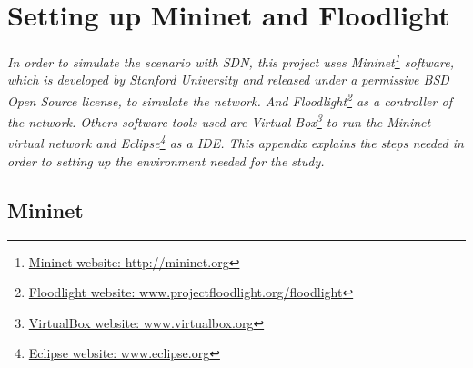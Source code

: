 

\chapter{Setting up Mininet and Floodlight}

\textit{In order to simulate the scenario with SDN, this project uses Mininet\footnote{\href{http://mininet.org/}{Mininet website: http://mininet.org}} software, which is developed by Stanford University and released under a permissive BSD Open Source license, to simulate the network. And Floodlight\footnote{\href{http://www.projectfloodlight.org/floodlight/}{Floodlight website: www.projectfloodlight.org/floodlight}} as a controller of the network. Others software tools used are Virtual Box\footnote{\href{https://www.virtualbox.org}{VirtualBox website: www.virtualbox.org}} to run the Mininet virtual network and Eclipse\footnote{\href{https://www.eclipse.org}{Eclipse website: www.eclipse.org}} as a IDE. This appendix explains the steps needed in order to setting up the environment needed for the study.} 


\section{Mininet}

